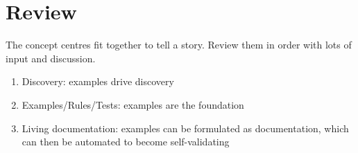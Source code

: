     \section*{Review}
    
    The concept centres fit together to tell a story. Review them in order with lots of input and discussion.
    
    \begin{enumerate}
        \item Discovery: examples drive discovery
        \item Examples/Rules/Tests: examples are the foundation
        \item Living documentation: examples can be formulated as documentation, which can then be automated to become self-validating
    \end{enumerate}
   
    
\fi
